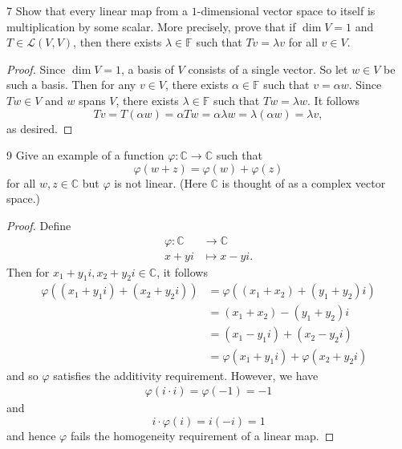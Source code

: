 \documentclass{extarticle}
\newenvironment{problem}[1]{\begin{prob*}{#1}{}}{\end{prob*}}
\newcommand{\C}{\mathbb{C}}
\newcommand{\F}{\mathbb{F}}
\newcommand{\Hom}{\mathcal{L}}
\begin{document}
\begin{problem}{7}
Show that every linear map from a $1$-dimensional vector space to itself is multiplication by some scalar.  More precisely, prove that if $\dim V= 1$ and $T\in\Hom(V,V)$, then there exists $\lambda\in\F$ such that $Tv = \lambda v$ for all $v\in V$.
\end{problem}
\begin{proof}
Since $\dim V = 1$, a basis of $V$ consists of a single vector.  So let $w\in V$ be such a basis.  Then for any $v\in V$, there exists $\alpha\in\F$ such that $v = \alpha w$.  Since $Tw\in V$ and $w$ spans $V$, there exists $\lambda\in \F$ such that $Tw = \lambda w$.  It follows
\begin{equation*}
Tv = T(\alpha w) = \alpha Tw = \alpha\lambda w = \lambda(\alpha w) = \lambda v,
\end{equation*}
as desired.
\end{proof}

\begin{problem}{9}
Give an example of a function $\varphi:\C\to\C$ such that 
\begin{equation*}
\varphi(w + z) = \varphi(w) + \varphi(z)
\end{equation*}
for all $w,z\in\C$ but $\varphi$ is not linear.  (Here $\C$ is thought of as a complex vector space.)
\end{problem}
\begin{proof}
Define 
\begin{align*}
\varphi:\C&\to\C\\
       x + yi &\mapsto x - yi.
\end{align*}
Then for $x_1 + y_1i, x_2 + y_2i\in\C$, it follows
\begin{align*}
\varphi((x_1 + y_1i) + (x_2 + y_2i)) &= \varphi((x_1 + x_2) + (y_1 + y_2)i)\\
&= (x_1 + x_2) - (y_1 + y_2)i\\
&= (x_1 - y_1i) + (x_2 - y_2i)\\
&= \varphi(x_1 + y_1i) + \varphi(x_2 + y_2i)
\end{align*}
and so $\varphi$ satisfies the additivity requirement.  However, we have
\begin{align*}
\varphi(i\cdot i) = \varphi(-1) = -1
\end{align*}
and 
\begin{equation*}
i\cdot\varphi(i) = i(-i) = 1
\end{equation*}
and hence $\varphi$ fails the homogeneity requirement of a linear map.
\end{proof}
\end{document}
